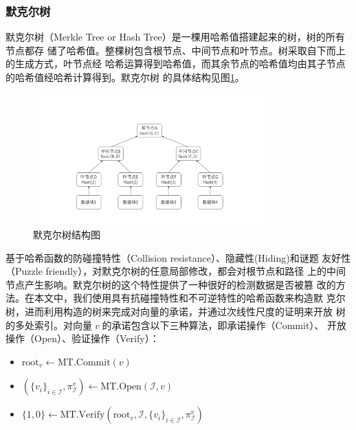 \documentclass[zihao=-4]{ctexart}
\begin{document}
\subsubsection{默克尔树}
默克尔树\cite{Merkle}（Merkle Tree or Hash Tree）是一棵用哈希值搭建起来的树，树的所有节点都存
储了哈希值。整棵树包含根节点、中间节点和叶节点。树采取自下而上的生成方式，叶节点经
哈希运算得到哈希值，而其余节点的哈希值均由其子节点的哈希值经哈希计算得到。默克尔树
的具体结构见图\ref{Merkle}。
\begin{figure}[H]
  \centering
  \includegraphics[width=0.8\textwidth]{Merkle_tree.bmp} 
  \caption{默克尔树结构图}
  \label{Merkle}
\end{figure}
基于哈希函数的防碰撞特性（Collision resistance）、隐藏性(Hiding)和谜题
友好性（Puzzle friendly），对默克尔树的任意局部修改，都会对根节点和路径
上的中间节点产生影响。默克尔树的这个特性提供了一种很好的检测数据是否被篡
改的方法。在本文中，我们使用具有抗碰撞特性和不可逆特性的哈希函数来构造默
克尔树，进而利用构造的树来完成对向量的承诺，并通过次线性尺度的证明来开放
树的多处索引。对向量$\;v\;$的承诺包含以下三种算法，即承诺操作（Commit）、
开放操作（Open）、验证操作（Verify）：
\begin{itemize}
  \item $\text{root}_v\leftarrow \text{MT.Commit}(v)$
  \item $(\{v_i\}_{i\in\mathcal{I}},\pi^v_{\mathcal{I}})\leftarrow\text{MT.Open}(\mathcal{I},v)$
  \item $\{1,0\}\leftarrow\text{MT.Verify}(\text{root}_v,\mathcal{I},\{v_i\}_{i\in\mathcal{I}},\pi^v_{\mathcal{I}})$
\end{itemize}
\end{document}
